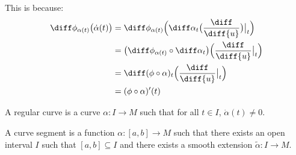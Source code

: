         This is because:
        \begin{align}
            \diff\phi_{\alpha(t)}\big(\dot{\alpha}(t)\big)
            &=\diff\phi_{\alpha(t)}\Big(\diff\alpha_{t}
                \big(\frac{\diff}{\diff{u}}\big)\big|_{t}\Big)\\
                &=\big(\diff\phi_{\alpha(t)}\circ\diff\alpha_{t}\big)
                    \Big(\frac{\diff}{\diff{u}}\big|_{t}\Big)\\
                &=\diff(\phi\circ\alpha)_{t}
                    \Big(\frac{\diff}{\diff{u}}\big|_{t}\Big)\\
                &=(\phi\circ\alpha)'(t)
        \end{align}
        \begin{definition}
            A regular curve is a curve $\alpha:I\rightarrow{M}$ such that
            for all $t\in{I}$, $\dot{\alpha}(t)\ne{0}$.
        \end{definition}
        \begin{definition}
            A curve segment is a function $\alpha:[a,b]\rightarrow{M}$ such
            that there exists an open interval $I$ such that
            $[a,b]\subseteq{I}$ and there exists a smooth extension
            $\tilde{\alpha}:I\rightarrow{M}$.
        \end{definition}
